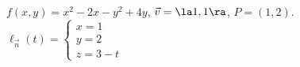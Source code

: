{$f(x,y) = x^2-2x-y^2+4y$,  $\vec v = \la 1,1\ra$, $P=(1,2)$.
}
{
$\ell_{\vec n}(t) = \left\{\begin{array}{l} x = 1\\ y = 2 \\ z = 3 -t \end{array} \right.$ 
}
